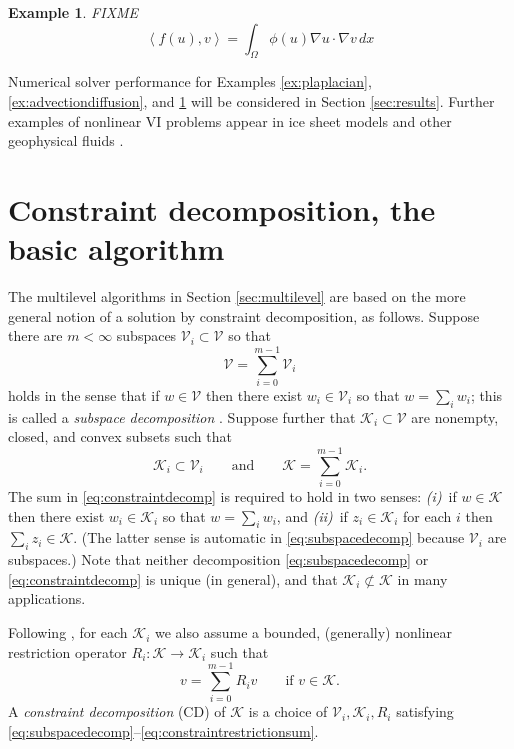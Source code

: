 \documentclass[letterpaper,final,12pt,reqno]{amsart}
\theoremstyle{cstyle}
\theoremstyle{cstyle*}
\theoremstyle{dstyle}
\newtheorem{example}[theorem]{Example}
\numberwithin{equation}{section}
\numberwithin{figure}{section}
\numberwithin{table}{section}
\numberwithin{theorem}{section}
\newcommand{\grad}{\nabla}
\newcommand{\cK}{\mathcal{K}}
\newcommand{\cV}{\mathcal{V}}
\newcommand{\ip}[2]{\left<#1,#2\right>}
\begin{document}
\begin{example}  \label{ex:porous}  FIXME
\begin{equation}
\ip{f(u)}{v} = \int_\Omega \phi(u) \grad u \cdot \grad v\,dx \label{eq:porous}
\end{equation}
\end{example}

Numerical solver performance for Examples \ref{ex:plaplacian}, \ref{ex:advectiondiffusion}, and \ref{ex:porous} will be considered in Section \ref{sec:results}.  Further examples of nonlinear VI problems appear in ice sheet models \cite{Calvoetal2002,JouvetBueler2012} and other geophysical fluids \cite{Bueler2021conservation}.


\section{Constraint decomposition, the basic algorithm} \label{sec:cd}

The multilevel algorithms in Section \ref{sec:multilevel} are based on the more general notion of a solution by constraint decomposition, as follows.  Suppose there are $m<\infty$ subspaces $\cV_i \subset \cV$ so that
\begin{equation}
\cV = \sum_{i=0}^{m-1} \cV_i \label{eq:subspacedecomp}
\end{equation}
holds in the sense that if $w \in \cV$ then there exist $w_i \in \cV_i$ so that $w = \sum_i w_i$; this is called a \emph{subspace decomposition} \cite{Xu1992}.  Suppose further that $\cK_i \subset \cV$ are nonempty, closed, and convex subsets such that
\begin{equation}
\cK_i \subset \cV_i \qquad \text{and} \qquad \cK = \sum_{i=0}^{m-1} \cK_i. \label{eq:constraintdecomp}
\end{equation}
The sum in \eqref{eq:constraintdecomp} is required to hold in two senses: \emph{(i)}~if $w \in \cK$ then there exist $w_i \in \cK_i$ so that $w = \sum_i w_i$, and \emph{(ii)}~if $z_i \in \cK_i$ for each $i$ then $\sum_i z_i \in \cK$.  (The latter sense is automatic in \eqref{eq:subspacedecomp} because $\cV_i$ are subspaces.)  Note that neither decomposition \eqref{eq:subspacedecomp} or \eqref{eq:constraintdecomp} is unique (in general), and that $\cK_i \not\subset \cK$ in many applications.

Following \cite{Tai2003}, for each $\cK_i$ we also assume a bounded, (generally) nonlinear restriction operator $R_i : \cK \to \cK_i$ such that
\begin{equation}
v = \sum_{i=0}^{m-1} R_i v \qquad \text{if } v \in \cK.  \label{eq:constraintrestrictionsum}
\end{equation}
A \emph{constraint decomposition} (CD) of $\cK$ is a choice of $\cV_i,\cK_i,R_i$ satisfying \eqref{eq:subspacedecomp}--\eqref{eq:constraintrestrictionsum}.
\end{document}
